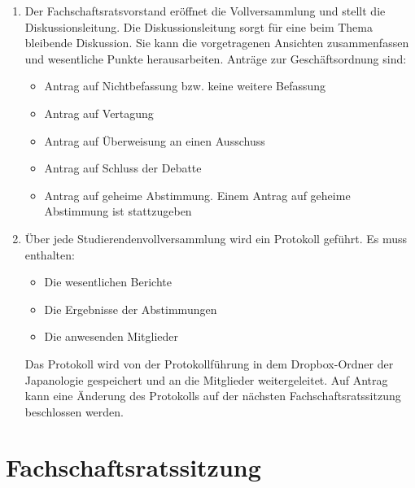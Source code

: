 \documentclass[12pt]{scrartcl}
\begin{document}
\begin{enumerate}
	\item Der Fachschaftsratsvorstand eröffnet die Vollversammlung und stellt die Diskussionsleitung. Die Diskussionsleitung sorgt für eine beim Thema bleibende Diskussion. Sie kann die vorgetragenen Ansichten zusammenfassen und wesentliche Punkte herausarbeiten. Anträge zur Geschäftsordnung sind:
	\begin{itemize}
		\item Antrag auf Nichtbefassung bzw. keine weitere Befassung
		\item Antrag auf Vertagung
		\item Antrag auf Überweisung an einen Ausschuss
		\item Antrag auf Schluss der Debatte
		\item Antrag auf geheime Abstimmung. Einem Antrag auf geheime Abstimmung ist stattzugeben
	\end{itemize}
	\item Über jede Studierendenvollversammlung wird ein Protokoll geführt. Es muss enthalten:
	\begin{itemize}
		\item Die wesentlichen Berichte
		\item Die Ergebnisse der Abstimmungen
		\item Die anwesenden Mitglieder
	\end{itemize}
	Das Protokoll wird von der Protokollführung in dem Dropbox-Ordner der Japanologie gespeichert und an die Mitglieder weitergeleitet. Auf Antrag kann eine Änderung des Protokolls auf der nächsten Fachschaftsratssitzung beschlossen werden.
\end{enumerate}

\section{Fachschaftsratssitzung}
\end{document}
